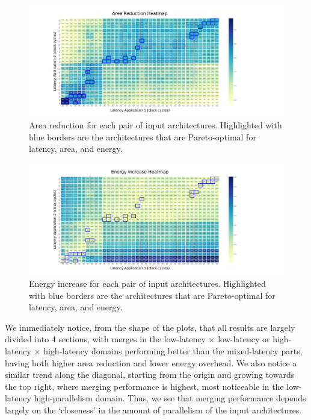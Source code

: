 \begin{figure}[!htb]
    \centering
    \hspace*{-1.75cm}\includegraphics[width=1.4\textwidth]{graphs/plot_heatmap_area_reduction.png}
    \caption{Area reduction for each pair of input architectures. Highlighted with blue borders are the architectures that are Pareto-optimal for latency, area, and energy.}
    \label{fig:plot_heatmap_area_reduction}
\end{figure}

\begin{figure}[!htb]
    \centering
    \hspace*{-1.75cm}\includegraphics[width=1.4\textwidth]{graphs/plot_heatmap_energy_increase.png}
    \caption{Energy increase for each pair of input architectures. Highlighted with blue borders are the architectures that are Pareto-optimal for latency, area, and energy.}
    \label{fig:plot_heatmap_energy_increase}
\end{figure}

We immediately notice, from the shape of the plots, that all results are largely divided into 4 sections, with merges in the low-latency $\times$ low-latency or high-latency $\times$ high-latency domains performing better than the mixed-latency parts, having both higher area reduction and lower energy overhead. We also notice a similar trend along the diagonal, starting from the origin and growing towards the top right, where merging performance is highest, most noticeable in the low-latency high-parallelism domain. Thus, we see that merging performance depends largely on the `closeness' in the amount of parallelism of the input architectures.

